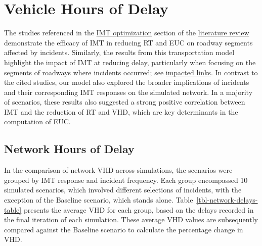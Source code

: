 \documentclass[fancy, oneside, mastersfancy, ms]{byuthesis}
\begin{document}
\hypertarget{vehicle-hours-of-delay}{%
\section{Vehicle Hours of Delay}\label{vehicle-hours-of-delay}}

The studies referenced in the \protect\hyperlink{sec-lit_imt_opt}{IMT
optimization} section of the
\protect\hyperlink{sec-literature}{literature review} demonstrate the
efficacy of IMT in reducing RT and EUC on roadway segments affected by
incidents. Similarly, the results from this transportation model
highlight the impact of IMT at reducing delay, particularly when
focusing on the segments of roadways where incidents occurred; see
\protect\hyperlink{sec-impacted}{impacted links}. In contrast to the
cited studies, our model also explored the broader implications of
incidents and their corresponding IMT responses on the simulated
network. In a majority of scenarios, these results also suggested a
strong positive correlation between IMT and the reduction of RT and VHD,
which are key determinants in the computation of EUC.

\hypertarget{network-hours-of-delay}{%
\subsection{Network Hours of Delay}\label{network-hours-of-delay}}

In the comparison of network VHD across simulations, the scenarios were
grouped by IMT response and incident frequency. Each group encompassed
10 simulated scenarios, which involved different selections of
incidents, with the exception of the Baseline scenario, which stands
alone. Table~\ref{tbl-network-delays-table} presents the average VHD for
each group, based on the delays recorded in the final iteration of each
simulation. These average VHD values are subsequently compared against
the Baseline scenario to calculate the percentage change in VHD.
\end{document}
